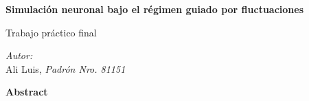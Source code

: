 \thispagestyle{plain}
\begin{center}
    \Large
    \textbf{Simulación neuronal bajo el régimen guiado por fluctuaciones}
        
    \vspace{0.4cm}
    \large
    Trabajo práctico final
        
    \vspace{0.4cm}
    \small{\emph{Autor:}\\
      	Ali Luis, \textit{Padrón Nro. 81151}
      	}
       
    \vspace{0.9cm}
    \textbf{Abstract}
\end{center}
\lipsum[1]